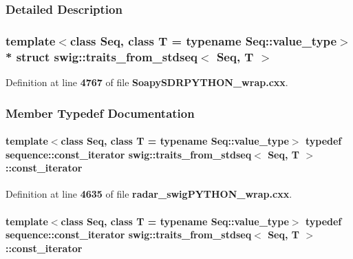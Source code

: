\subsubsection{Detailed Description}
\subsubsection*{template$<$class Seq, class T = typename Seq\+::value\+\_\+type$>$\\*
struct swig\+::traits\+\_\+from\+\_\+stdseq$<$ Seq, T $>$}



Definition at line {\bf 4767} of file {\bf Soapy\+S\+D\+R\+P\+Y\+T\+H\+O\+N\+\_\+wrap.\+cxx}.



\subsubsection{Member Typedef Documentation}
\paragraph[{const\+\_\+iterator}]{\setlength{\rightskip}{0pt plus 5cm}template$<$class Seq, class T = typename Seq\+::value\+\_\+type$>$ typedef sequence\+::const\+\_\+iterator {\bf swig\+::traits\+\_\+from\+\_\+stdseq}$<$ Seq, T $>$\+::{\bf const\+\_\+iterator}}\label{structswig_1_1traits__from__stdseq_ab1c085e18d48f5f0afe549b4dc885290}


Definition at line {\bf 4635} of file {\bf radar\+\_\+swig\+P\+Y\+T\+H\+O\+N\+\_\+wrap.\+cxx}.

\paragraph[{const\+\_\+iterator}]{\setlength{\rightskip}{0pt plus 5cm}template$<$class Seq, class T = typename Seq\+::value\+\_\+type$>$ typedef sequence\+::const\+\_\+iterator {\bf swig\+::traits\+\_\+from\+\_\+stdseq}$<$ Seq, T $>$\+::{\bf const\+\_\+iterator}}\label{structswig_1_1traits__from__stdseq_ab1c085e18d48f5f0afe549b4dc885290}


